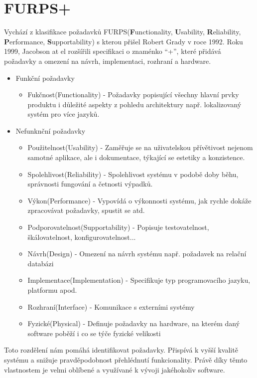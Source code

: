 \section{FURPS+}
	Vychází z klasifikace požadavků FURPS(\textbf{F}unctionality, \textbf{U}sability, \textbf{R}eliability, \textbf{P}erformance, \textbf{S}upportability) s kterou přišel Robert Grady v roce 1992. Roku 1999, Jacobson at el rozšířili specifikaci o znaménko \enquote{+}, které přidává požadavky a omezení na návrh, implementaci, rozhraní a hardware\cite{furps}. 
	
	\begin{itemize}
		\item Funkční požadavky
			\begin{itemize}
				\item Fukčnost(Functionality) - Požadavky popisující všechny hlavní prvky produktu i důležité aspekty z pohledu architektury např. lokalizovaný systém pro více jazyků.
			\end{itemize}
		\item Nefunknční požadavky
			\begin{itemize}
				\item Použitelnost(Usability) - Zaměřuje se na uživatelskou přívětivost nejenom samotné aplikace, ale i dokumentace, týkající se estetiky a konzistence.
				\item Spolehlivost(Reliability) - Spolehlivost systému v podobě doby běhu, správnosti fungování a četnosti výpadků.
				\item Výkon(Performance) - Vypovídá o výkonnosti systému, jak rychle dokáže zpracovávat požadavky, spustit se atd.
				\item Podporovatelnost(Supportability) - Popisuje testovatelnost, škálovatelnost, konfigurovatelnost...
				\item Návrh(Design) - Omezení na návrh systému např. požadavek na relační databázi
				\item Implementace(Implementation) - Specifikuje typ programovacího jazyku, platformu apod.
				\item Rozhraní(Interface) - Komunikace s externími systémy
				\item Fyzické(Physical) - Definuje požadavky na hardware, na kterém daný software poběží i co se týče fyzické velikosti
			\end{itemize}
	\end{itemize}
	
	Toto rozdělení nám pomáhá identifikovat požadavky. Přispívá k vyšší kvalitě systému a snižuje pravděpodobnost přehlédnutí funkcionality. Právě díky těmto vlastnostem je velmi oblíbené a využívané k vývoji jakéhokoliv software. 